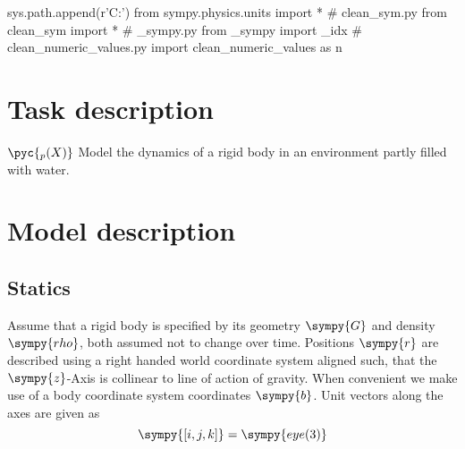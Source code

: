 \documentclass[12pt,a4paper]{article}
\newcommand{\s}{\sympy}
\begin{document}
\tableofcontents

\begin{sympycode}
sys.path.append(r'C:\Users\Murad\evrythg')
from sympy.physics.units import *
# clean_sym.py
from clean_sym import *
# _sympy.py 
from _sympy import _idx
# clean_numeric_values.py
import clean_numeric_values as n
\end{sympycode}



\section{Task description}
$\pyc{_p(X)}$
Model the dynamics of a rigid body in an environment partly filled with water.
\section{Model description}
\subsection{Statics}
Assume that a rigid body is specified by its geometry $\s{G}$ and density $\s{rho}$, both assumed not to change over time.    Positions $\s{r}$ are described using a right handed world coordinate system aligned such, that the $\s{z}$-Axis is collinear to line of action of gravity.  When convenient we make use of a body coordinate system coordinates $\s{b}$.  Unit vectors along the axes are given as
\begin{equation*}
\s{[i, j, k]} = \s{eye(3)}
\end{equation*}
\end{document}

